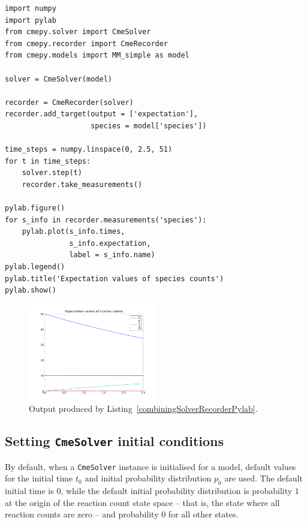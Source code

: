 \documentclass{article}
\newcommand{\mono}[1]{\texttt{#1}}
\newcommand{\lstref}[1]{Listing~\ref{#1}}
\begin{document}
\begin{lstlisting}[frame=tb,
caption={Example: solving a model and plotting species counts},
label=combiningSolverRecorderPylab]
import numpy
import pylab
from cmepy.solver import CmeSolver
from cmepy.recorder import CmeRecorder
from cmepy.models import MM_simple as model

solver = CmeSolver(model)

recorder = CmeRecorder(solver)
recorder.add_target(output = ['expectation'],
                    species = model['species'])

time_steps = numpy.linspace(0, 2.5, 51)
for t in time_steps:
    solver.step(t)
    recorder.take_measurements()

pylab.figure()
for s_info in recorder.measurements('species'):
    pylab.plot(s_info.times,
               s_info.expectation,
               label = s_info.name)
pylab.legend()
pylab.title('Expectation values of species counts')
pylab.show()
\end{lstlisting}

\begin{figure}[p!]
\centering
\includegraphics[width=0.5\textwidth]{./fig_combiningSolverRecorderPylab.png}
\caption{Output produced by \lstref{combiningSolverRecorderPylab}.}
\label{fig:combiningSolverRecorderPylab}
\end{figure}

\subsection{Setting \mono{CmeSolver} initial conditions}
By default, when a \mono{CmeSolver} instance is initialised for a model, default
values for the initial time $t_0$ and initial probability distribution $p_0$
are used. The default initial time is $0$, while the default initial
probability distribution is probability $1$ at the origin of the reaction
count state space -- that is, the state where all reaction counts are zero --
and probability $0$ for all other states.
\end{document}
